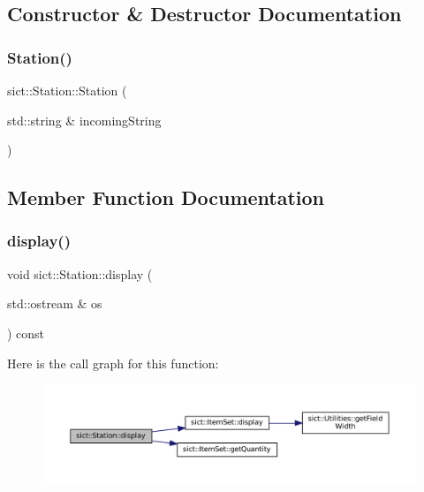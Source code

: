 \subsection{Constructor \& Destructor Documentation}
\mbox{\label{classsict_1_1Station_a95b3910ac2cf806fed948b473c870e64}} 
\subsubsection{\texorpdfstring{Station()}{Station()}}
{\footnotesize\ttfamily sict\+::\+Station\+::\+Station (\begin{DoxyParamCaption}\item[{std\+::string \&}]{incoming\+String }\end{DoxyParamCaption})}



\subsection{Member Function Documentation}
\mbox{\label{classsict_1_1Station_a83b3f64c0c2063a730a14888869b022d}} 
\subsubsection{\texorpdfstring{display()}{display()}}
{\footnotesize\ttfamily void sict\+::\+Station\+::display (\begin{DoxyParamCaption}\item[{std\+::ostream \&}]{os }\end{DoxyParamCaption}) const}

Here is the call graph for this function\+:
\nopagebreak
\begin{figure}[H]
\begin{center}
\leavevmode
\includegraphics[width=350pt]{classsict_1_1Station_a83b3f64c0c2063a730a14888869b022d_cgraph}
\end{center}
\end{figure}
\mbox{\label{classsict_1_1Station_ad81558c1e92485344e5d0b1b773b0fae}} 
